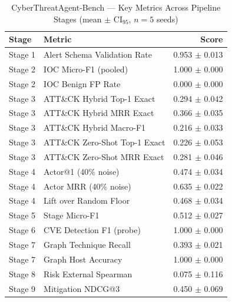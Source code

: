 \begin{table}[t]
\centering
\caption{CyberThreatAgent-Bench --- Key Metrics Across Pipeline Stages (mean $\pm$ CI$_{95}$, $n=5$ seeds)}
\label{tab:scorecard}
\begin{tabular}{llr}
\toprule
Stage & Metric & Score \\ \midrule
Stage 1 & Alert Schema Validation Rate & 0.953 $\pm$ 0.013 \\
Stage 2 & IOC Micro-F1 (pooled) & 1.000 $\pm$ 0.000 \\
Stage 2 & IOC Benign FP Rate & 0.000 $\pm$ 0.000 \\
Stage 3 & ATT\&CK Hybrid Top-1 Exact & 0.294 $\pm$ 0.042 \\
Stage 3 & ATT\&CK Hybrid MRR Exact & 0.366 $\pm$ 0.035 \\
Stage 3 & ATT\&CK Hybrid Macro-F1 & 0.216 $\pm$ 0.033 \\
Stage 3 & ATT\&CK Zero-Shot Top-1 Exact & 0.226 $\pm$ 0.053 \\
Stage 3 & ATT\&CK Zero-Shot MRR Exact & 0.281 $\pm$ 0.046 \\
Stage 4 & Actor@1 (40\% noise) & 0.474 $\pm$ 0.034 \\
Stage 4 & Actor MRR (40\% noise) & 0.635 $\pm$ 0.022 \\
Stage 4 & Lift over Random Floor & 0.468 $\pm$ 0.034 \\
Stage 5 & Stage Micro-F1 & 0.512 $\pm$ 0.027 \\
Stage 6 & CVE Detection F1 (probe) & 1.000 $\pm$ 0.000 \\
Stage 7 & Graph Technique Recall & 0.393 $\pm$ 0.021 \\
Stage 7 & Graph Host Accuracy & 1.000 $\pm$ 0.000 \\
Stage 8 & Risk External Spearman & 0.075 $\pm$ 0.116 \\
Stage 9 & Mitigation NDCG@3 & 0.450 $\pm$ 0.069 \\
\bottomrule
\end{tabular}
\end{table}